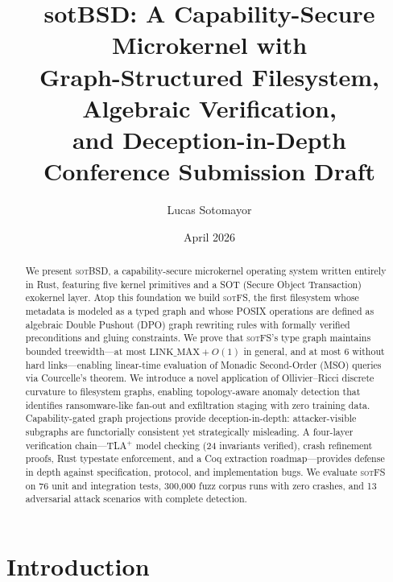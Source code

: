 \documentclass[11pt,a4paper]{article}
\title{
  \vspace{-1.5cm}
  \textbf{sotBSD}: A Capability-Secure Microkernel with \\
  Graph-Structured Filesystem, Algebraic Verification, \\
  and Deception-in-Depth \\[0.6em]
  \normalsize Conference Submission Draft
}
\author{
  Lucas Sotomayor
}
\date{April 2026}
\theoremstyle{definition}
\theoremstyle{remark}
\newcommand{\sotfs}{\textsc{sotFS}}
\newcommand{\sotbsd}{\textsc{sotBSD}}
\begin{document}

\maketitle
\thispagestyle{empty}

\begin{abstract}
\noindent
We present \sotbsd{}, a capability-secure microkernel operating system
written entirely in Rust, featuring five kernel primitives and a
SOT (Secure Object Transaction) exokernel layer. Atop this foundation
we build \sotfs{}, the first filesystem whose metadata is modeled as a
typed graph and whose POSIX operations are defined as algebraic
Double Pushout (DPO) graph rewriting rules with formally verified
preconditions and gluing constraints. We prove that \sotfs{}'s type
graph maintains bounded treewidth---at most $\mathrm{LINK\_MAX} + O(1)$
in general, and at most 6 without hard links---enabling linear-time
evaluation of Monadic Second-Order (MSO) queries via Courcelle's
theorem. We introduce a novel application of Ollivier--Ricci discrete
curvature to filesystem graphs, enabling topology-aware anomaly
detection that identifies ransomware-like fan-out and exfiltration
staging with zero training data. Capability-gated graph projections
provide deception-in-depth: attacker-visible subgraphs are functorially
consistent yet strategically misleading. A four-layer verification
chain---TLA$^+$ model checking (24 invariants verified), crash
refinement proofs, Rust typestate enforcement, and a Coq extraction
roadmap---provides defense in depth against specification, protocol,
and implementation bugs. We evaluate \sotfs{} on 76 unit and integration
tests, 300{,}000 fuzz corpus runs with zero crashes, and 13 adversarial
attack scenarios with complete detection.
\end{abstract}

\tableofcontents
\newpage

\section{Introduction}
\label{sec:intro}
\end{document}
